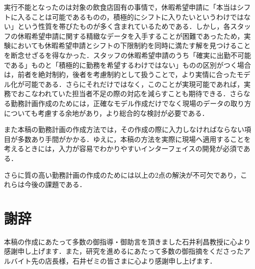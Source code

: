 \documentclass[11pt]{jsarticle}
\begin{document}
実行不能となったのは対象の飲食店固有の事情で，休暇希望申請に「本当はシフトに入ることは可能であるものの，積極的にシフトに入りたいというわけではない」という性質を帯びたものが多く含まれているためである．しかし，各スタッフの休暇希望申請に関する精緻なデータを入手することが困難であったため，実験においても休暇希望申請とシフトの下限制約を同時に満たす解を見つけることを断念せざるを得なかった．スタッフの休暇希望申請のうち「確実に出勤不可能である」ものと「積極的に勤務を希望するわけではない」ものの区別がつく場合は，前者を絶対制約，後者を考慮制約として扱うことで，より実情に合ったモデル化が可能である．さらにそれだけではなく，このことが実現可能であれば，実務でおこなわれていた担当者不足の際の対応を減らすことも期待できる．さらなる勤務計画作成のためには，正確なモデル作成だけでなく現場のデータの取り方についても考慮する余地があり，より総合的な検討が必要である．

また本稿の勤務計画の作成方法では，その作成の際に入力しなければならない項目が多数あり手間がかかる．ゆえに，本稿の方法を実際に現場へ適用することを考えるときには，入力が容易でわかりやすいインターフェイスの開発が必須である．

さらに質の高い勤務計画の作成のためには以上の2点の解決が不可欠であり，これらは今後の課題である．

\section*{謝辞}
本稿の作成にあたって多数の御指導・御助言を頂きました石井利昌教授に心より感謝申し上げます．また，研究を進めるにあたって多数の御指摘をくださったアルバイト先の店長様，石井ゼミの皆さまに心より感謝申し上げます．
\end{document}
